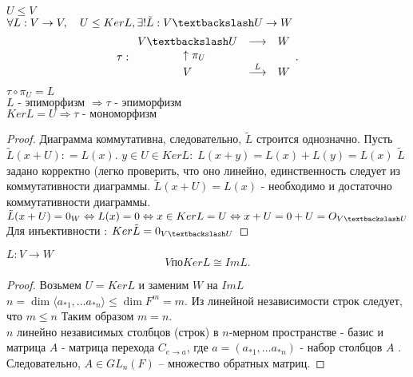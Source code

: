 \documentclass[12pt]{report}
\begin{document}
\begin{thm}
    $U \le V$ \\
    $\forall L: V \to V, \quad U \le Ker L, \exists ! \tilde L : V \textbackslash U \to W $
    \[
    \tau : 
    \begin{array}{ccc}
	V \textbackslash U &  \longrightarrow & W\\
	\uparrow \lefteqn{\pi_U} && \\
	V & \stackrel{L}{\longrightarrow} & W\\
    \end{array}
    .\] 
    $\tau \circ \pi _U = L$\\
    $L   \mbox{ - эпиморфизм } \Rightarrow \tau  \mbox{ - эпиморфизм }$ \\
    $Ker L = U \Rightarrow  \tau  \mbox{ - мономорфизм }$
\end{thm}
\begin{proof}
    Диаграмма коммутативна, следовательно, $\tilde L$ строится однозначно. Пусть $\tilde L(x + U) : = L(x)$.%
    $y \in U \in Ker L: \; L(x + y) = L(x) + L(y) = L(x)$
    $\tilde L$ задано корректно (легко проверить, что оно линейно, единственность следует из коммутативности диаграммы.
    $\tilde L(x + U) = L(x) $ - необходимо и достаточно коммутативности диаграммы.\\
    $\tilde L(x +U)=0_W \Leftrightarrow L(x) = 0 \Leftrightarrow x \in Ker L = U \Leftrightarrow x + U = 0 +U = O_{V \textbackslash U}$
    \\
    Для инъективности : $ Ker \tilde{L} = 0_{V \textbackslash U}$
\end{proof}
\begin{thm}[О гомоморфизме]
    $L : V \to W$
     \[
    V по Ker L \cong Im L
    .\] 
\end{thm}
\begin{proof}
    Возьмем $U = Ker L$ и заменим $W$ на $Im L$
    $n = \dim \langle a_{*1} , \ldots a_{*n} \rangle \le \dim F^m = m$. Из линейной независимости строк следует, что $m \le n$ Таким образом $m = n$.\\
    $n$ линейно независимых столбцов (строк) в $n$-мерном пространстве - базис и матрица $A$ - матрица перехода $C_{e \to a}$, где $a=(a_{*1}, \ldots a_{*n})$ - набор столбцов $A$ .
    Следовательно, $A \in GL_n(F)$ -- множество обратных матриц.
\end{proof}
\end{document}
